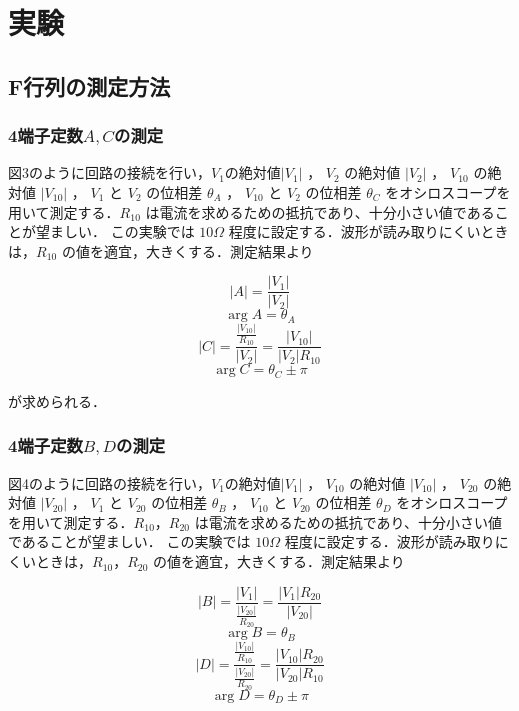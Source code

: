 
\section{実験}
\subsection{F行列の測定方法}
\subsubsection{4端子定数$A,C$の測定}
図3のように回路の接続を行い，$V_1$の絶対値$\left|V_1\right|$ ， $V_2$ の絶対値 $\left|V_2\right|$ ， $V_{10}$ の絶対値 $\left|V_{10}\right|$ ， $V_1$ と $V_2$ の位相差 $\theta_A$ ， $V_{10}$ と $V_2$ の位相差 $\theta_C$
をオシロスコープを用いて測定する．$R_{10}$ は電流を求めるための抵抗であり、十分小さい値であることが望ましい．
この実験では $10 \Omega$ 程度に設定する．波形が読み取りにくいときは，$R_{10}$ の値を適宜，大きくする．測定結果より

$$
|A|=\frac{\left|V_1\right|}{\left|V_2\right|}
$$
$$
\arg A=\theta_A
$$
$$
|C|=\frac{\frac{\left|V_{10}\right|}{R_{10}}}{\left|V_2\right|}=\frac{\left|V_{10}\right|}{\left|V_2\right| R_{10}}
$$
$$
\arg C=\theta_C \pm \pi
$$

が求められる．
\subsubsection{4端子定数$B,D$の測定}
図4のように回路の接続を行い，$V_1$の絶対値$\left|V_1\right|$ ， $V_{10}$ の絶対値 $\left|V_{10}\right|$ ， $V_{20}$ の絶対値 $\left|V_{20}\right|$ ， $V_1$ と $V_{20}$ の位相差 $\theta_B$ ， $V_{10}$ と $V_{20}$ の位相差 $\theta_D$
をオシロスコープを用いて測定する．$R_{10}$，$R_{20}$ は電流を求めるための抵抗であり、十分小さい値であることが望ましい．
この実験では $10 \Omega$ 程度に設定する．波形が読み取りにくいときは，$R_{10}$，$R_{20}$ の値を適宜，大きくする．測定結果より

$$
|B|=\frac{\left|V_1\right|}{\frac{\left|V_{20}\right|}{R_{20}}}=\frac{\left|V_1\right| R_{20}}{\left|V_{20}\right|}
$$
$$
\arg B=\theta_B
$$
$$
|D|=\frac{\frac{\left|V_{10}\right|}{R_{10}}}{\frac{\left|V_{20}\right|}{R_{20}}}=\frac{\left|V_{10}\right| R_{20}}{\left|V_{20}\right| R_{10}}
$$
$$
\arg D=\theta_D \pm \pi
$$



